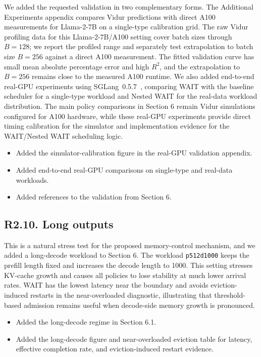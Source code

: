 
\response We added the requested validation in two complementary forms. The Additional Experiments appendix compares Vidur predictions with direct A100 measurements for Llama-2-7B on a single-type calibration grid. The raw Vidur profiling data for this Llama-2-7B/A100 setting cover batch sizes through \(B=128\); we report the profiled range and separately test extrapolation to batch size \(B=256\) against a direct A100 measurement. The fitted validation curve has small mean absolute percentage error and high \(R^2\), and the extrapolation to \(B=256\) remains close to the measured A100 runtime. We also added end-to-end real-GPU experiments using SGLang~0.5.7~\citep{sglang-github}, comparing WAIT with the baseline scheduler for a single-type workload and Nested WAIT for the real-data workload distribution. The main policy comparisons in Section 6 remain Vidur simulations configured for A100 hardware, while these real-GPU experiments provide direct timing calibration for the simulator and implementation evidence for the WAIT/Nested WAIT scheduling logic.

\changes
\begin{itemize}
    \item Added the simulator-calibration figure in the real-GPU validation appendix.
    \item Added end-to-end real-GPU comparisons on single-type and real-data workloads.
    \item Added references to the validation from Section 6.
\end{itemize}

\subsection*{R2.10. Long outputs}


\response This is a natural stress test for the proposed memory-control mechanism, and we added a long-decode workload to Section 6. The workload \texttt{p512d1000} keeps the prefill length fixed and increases the decode length to 1000. This setting stresses KV-cache growth and causes all policies to lose stability at much lower arrival rates. WAIT has the lowest latency near the boundary and avoids eviction-induced restarts in the near-overloaded diagnostic, illustrating that threshold-based admission remains useful when decode-side memory growth is pronounced.

\changes
\begin{itemize}
    \item Added the long-decode regime in Section 6.1.
    \item Added the long-decode figure and near-overloaded eviction table for latency, effective completion rate, and eviction-induced restart evidence.
\end{itemize}
